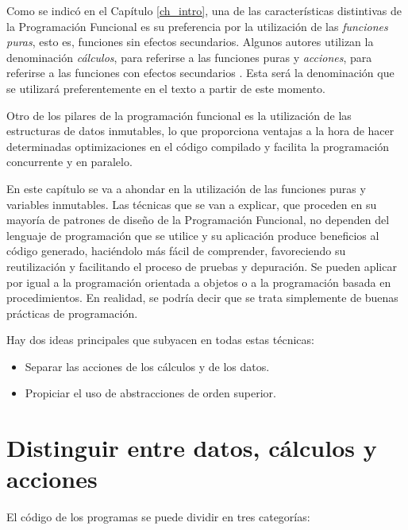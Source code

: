 \begin{Resumen}
   Como se indicó en el Capítulo \ref{ch_intro}, una de las características distintivas de la Programación Funcional es su preferencia por la utilización de las \textit{funciones puras}, esto es, funciones sin efectos secundarios. Algunos autores utilizan la denominación \textit{cálculos}, para referirse a las funciones puras y \textit{acciones}, para referirse a las funciones con efectos secundarios \citep{normandGrokkingSimplicityTaming2021}. Esta será la denominación que se utilizará preferentemente en el texto a partir de este momento.
   
   \smallskip
   
   Otro de los pilares de la programación funcional es la utilización de las estructuras de datos inmutables, lo que proporciona ventajas a la hora de hacer determinadas optimizaciones en el código compilado y facilita la programación concurrente y en paralelo. 
   
   \smallskip
   
   En este capítulo se va a ahondar en la utilización de las funciones puras y variables inmutables. Las técnicas que se van a explicar, que proceden en su mayoría de patrones de diseño de la Programación Funcional, no dependen del lenguaje de programación que se utilice y su aplicación  produce beneficios al código generado, haciéndolo más fácil de comprender, favoreciendo su reutilización y facilitando el proceso de pruebas y depuración. Se pueden aplicar por igual a la programación orientada a objetos o a la programación basada en procedimientos. En realidad, se podría decir que se trata simplemente de buenas prácticas de programación.
   
   \smallskip
   
   Hay dos ideas principales que subyacen en todas estas técnicas:
   
   \begin{itemize}
      \item Separar las acciones de los cálculos y de los datos.
      \item Propiciar el uso de abstracciones de orden superior.
   \end{itemize}
    
\end{Resumen}

\section{Distinguir entre datos, cálculos y acciones}
El código de los programas se puede dividir en tres categorías: 

